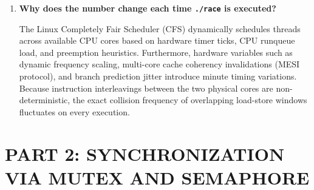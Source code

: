 \documentclass[12pt,a4paper]{report}
\numberwithin{equation}{chapter}
\numberwithin{figure}{chapter}
\numberwithin{table}{chapter}
\begin{document}
\begin{enumerate}
    Suppose the current value of \texttt{counter} stored in RAM is $100$:
    \begin{enumerate}
        \item Thread A executes step 1 (\textbf{Load}), reading $100$ into its local register \texttt{\%rax}$_A$.
        \item Before Thread A can perform step 3, a hardware timer interrupt triggers a context switch, or Thread B concurrently executes on another CPU core.
        \item Thread B executes step 1 (\textbf{Load}), reading the exact same value $100$ into its local register \texttt{\%rax}$_B$.
        \item Thread A resumes, executes step 2 (\textbf{Add}: $\text{\%rax}_A = 101$), and executes step 3 (\textbf{Store}), writing $101$ to \texttt{counter}.
        \item Thread B now executes step 2 (\textbf{Add}: $\text{\%rax}_B = 101$), and executes step 3 (\textbf{Store}), writing $101$ over \texttt{counter}.
    \end{enumerate}
    Although two separate additions were performed by the CPU cores, \texttt{counter} only transitioned from $100$ to $101$. Thread B completely overwrote Thread A's modification because both threads operated on stale data, resulting in a permanent lost update.

    \item \textbf{Why does the number change each time \texttt{./race} is executed?}
    
    The Linux Completely Fair Scheduler (CFS) dynamically schedules threads across available CPU cores based on hardware timer ticks, CPU runqueue load, and preemption heuristics. Furthermore, hardware variables such as dynamic frequency scaling, multi-core cache coherency invalidations (MESI protocol), and branch prediction jitter introduce minute timing variations. Because instruction interleavings between the two physical cores are non-deterministic, the exact collision frequency of overlapping load-store windows fluctuates on every execution.
\end{enumerate}

\chapter{PART 2: SYNCHRONIZATION VIA MUTEX AND SEMAPHORE}
\end{document}

